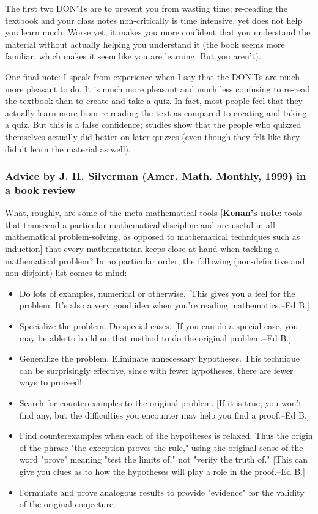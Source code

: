 \documentclass[11pt, a4paper]{article}
\begin{document}
The first two DON'Ts are to prevent you from wasting time; re-reading the textbook and your class notes non-critically is time intensive, yet does not help you learn much. Worse yet, it makes you more confident that you understand the material without actually helping you understand it (the book seems more familiar, which makes it seem like you are learning. But you aren't).

One final note: I speak from experience when I say that the DON'Ts are much more pleasant to do. It is much more pleasant and much less confusing to re-read the textbook than to create and take a quiz. In fact, most people feel that they actually learn more from re-reading the text as compared to creating and taking a quiz. But this is a false confidence; studies show that the people who quizzed themselves actually did better on later quizzes (even though they felt like they didn't learn the material as well).

\subsubsection*{Advice by J. H. Silverman (Amer. Math. Monthly, 1999) in a book review}
What, roughly, are some of the meta-mathematical tools [\textbf{Kenan's note}: tools that transcend a particular mathematical discipline and are useful in all mathematical problem-solving, as opposed to mathematical techniques such as induction] that every mathematician keeps close at hand when tackling a mathematical problem?  In no particular order, the following (non-definitive and non-disjoint) list comes to mind:

\begin{itemize}
\item Do lots of examples, numerical or otherwise. [This gives you a feel for the problem.  It's also a very good idea when you're reading mathematics.--Ed B.]
\item Specialize the problem.  Do special cases.  [If you can do a special case, you may be able to build on that method to do the original problem.--Ed B.]
\item Generalize the problem.  Eliminate unnecessary hypotheses. This technique can be surprisingly effective, since with fewer hypotheses, there are fewer ways to proceed!  
\item Search for counterexamples to the original problem.  [If it is true, you won't find any, but the difficulties you encounter may help you find a proof.--Ed B.]
\item Find counterexamples when each of the hypotheses is relaxed.  Thus the origin of the phrase "the exception proves the rule," using the original sense of the word "prove" meaning "test the limits of," not "verify the truth of."  [This can give you clues as to how the hypotheses will play a role in the proof.--Ed B.]
\item Formulate and prove analogous results to provide "evidence" for the validity of the original conjecture.
\end{itemize}
\end{document}
